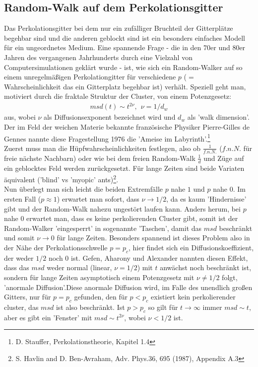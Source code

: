 \documentclass[a4paper, 12pt]{scrartcl}
\begin{document}
\subsection{Random-Walk auf dem Perkolationsgitter}
Das Perkolationsgitter bei dem nur ein zufälliger Bruchteil der Gitterplätze begehbar sind und die anderen geblockt sind ist ein besonders einfaches Modell für ein ungeordnetes Medium. Eine spannende Frage - die in den 70er und 80er Jahren des vergangenen Jahrhunderts durch eine Vielzahl von Computersimulationen geklärt wurde - ist, wie sich ein Random-Walker auf so einem unregelmäßigen Perkolationgitter für verschiedene $p$ ($=$ Wahrscheinlichkeit das ein Gitterplatz begehbar ist) verhält. Speziell geht man, motiviert durch die fraktale Struktur der Cluster, von einem Potenzgesetz:
\begin{align*}
msd(t) \sim t^{2 \nu},\ \ \nu=1/d_w
\end{align*} 
aus, wobei $\nu$ als Diffusionsexponent bezeichnet wird und $d_w$ als 'walk dimension'. Der im Feld der weichen Materie bekannte französische Physiker Pierre-Gilles de Gennes nannte diese Fragestellung 1976 die 'Ameise im Labyrinth'.\footnote[2]{D. Stauffer, Perkolationstheorie, Kapitel 1.4} 
\\ 
\noindent Zuerst muss man die Hüpfwahrscheinlichkeiten festlegen, also ob $\frac{1}{f.n.N.}$ ($f.n.N.$ für freie nächste Nachbarn) oder wie bei dem freien Random-Walk $\frac{1}{d}$ und Züge auf ein geblocktes Feld werden zurückgesetzt. Für lange Zeiten sind beide Variaten äquivalent ('blind' vs 'myopic' ants)\footnote{S. Havlin and D. Ben-Avraham, Adv. Phys.36, 695 (1987), Appendix A.3}.\\
 Nun überlegt man sich leicht die beiden Extremfälle $p$ nahe $1$ und $p$ nahe $0$. Im ersten Fall ($p \approx 1$) erwartet man sofort, dass $\nu \rightarrow1/2$, da es kaum 'Hindernisse' gibt und der Random-Walk nahezu ungestört laufen kann. Anders herum, bei $p$ nahe $0$ erwartet man, dass es keine perkolierenden Cluster gibt, somit ist der Random-Walker 'eingesperrt' in sogenannte 'Taschen', damit das $msd$ beschränkt und somit $\nu \rightarrow 0$ für lange Zeiten. Besonders spannend ist dieses Problem also in der Nähe der Perkolationsschwelle $p=p_c$, hier findet sich ein Diffusionskoeffizient, der weder $1/2$ noch $0$ ist. Gefen, Aharony und Alexander nannten diesen Effekt, dass das $msd$ weder normal (linear, $\nu = 1/2$) mit $t$ anwächst noch beschränkt ist, sondern für lange Zeiten asymptotisch einem Potenzgesetz mit $\nu \neq 1/2$ folgt, 'anormale Diffusion'.\footnotemark[6] Diese anormale Diffusion wird, im Falle des unendlich großen Gitters, nur für $p=p_c$ gefunden, den für $p<p_c$ existiert kein perkolierender cluster, das $msd$ ist also beschränkt. Ist $p > p_c$ so gilt für $t \rightarrow \infty $ immer $msd \sim t$, aber es gibt ein 'Fenster' mit $msd \sim t^{2\nu}$, wobei $\nu < 1/2$ ist.
\end{document}
